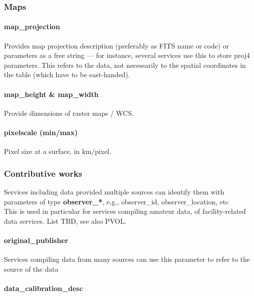 \documentclass[11pt,a4paper]{ivoa}
\begin{document}
\subsubsection{Maps\\}

\paragraph{map\_projection}

Provides map projection description (preferably as FITS name or code) or parameters as a free string — for instance, several services use this to store proj4 parameters. This refers to the data, not necessarily to the spatial coordinates in the table (which have to be east-handed).

\paragraph{map\_height \& map\_width}

Provide dimensions of raster maps / WCS.

\paragraph{pixelscale (min/max)}

Pixel size at a surface, in km/pixel.

\subsubsection{Contributive works\\}

Services\textbf{ }including data provided multiple sources can identify them with parameters of type \textbf{observer\_*}, e.g., observer\_id, observer\_location, etc\\This is used in particular for services compiling amateur data, of facility-related data services. List TBD, see also PVOL.

\paragraph{original\_publisher}

Services compiling data from many sources can use this\textbf{ }parameter to refer to the source of the data

\paragraph{data\_calibration\_desc}
\end{document}
